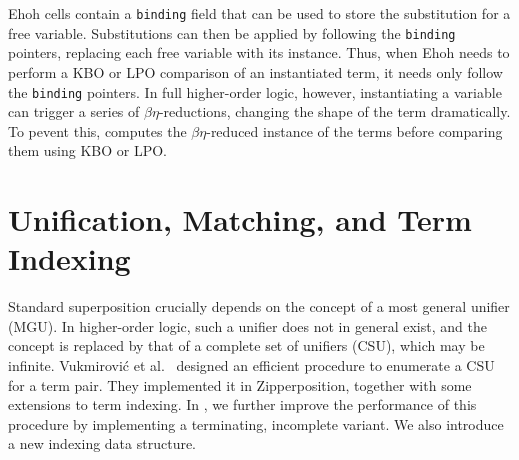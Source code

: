 Ehoh cells contain a \verb|binding| field that can be used to store the
substitution for a free variable. Substitutions can then be applied by following
the \texttt{binding} pointers, replacing each free variable with its instance.
Thus, when Ehoh needs to perform a KBO or LPO comparison of an instantiated term,
it needs only follow the \texttt{binding} pointers.
In full higher-order logic, however, instantiating a variable can trigger a
series of $\beta\eta$-reductions,
changing the shape of the term dramatically. To pevent this, \ehohii{}
computes the $\beta\eta$-reduced instance of the terms
before comparing them using KBO or LPO.

\section{Unification, Matching, and Term Indexing}
\label{sec:unif-match-index}

Standard superposition crucially depends on the concept of a most general unifier
(MGU).
In higher-order logic, such a unifier does not in general exist, and the concept
is replaced by that of a complete set of unifiers (CSU), which may be infinite.
Vukmirovi\'c et al.\ \cite{unif-section} designed an efficient
procedure to enumerate a CSU for a term pair. They
implemented it in Zipperposition, together with some extensions to term indexing.
In \ehohii{}, we further improve the performance of this procedure by implementing a terminating,
incomplete variant. We also introduce a new indexing data structure.

